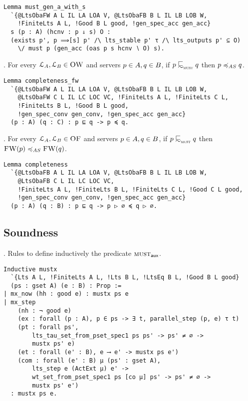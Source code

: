 \begin{mdframed}
\begin{verbatim}
Lemma must_gen_a_with_s
  `{@LtsObaFW A L IL LA LOA V, @LtsObaFB B L IL LB LOB W,
    !FiniteLts A L, !Good B L good, !gen_spec_acc gen_acc}
  s (p : A) (hcnv : p ⇓ s) O :
  (exists p', p ⟹[s] p' /\ lts_stable p' τ /\ lts_outputs p' ⊆ O)
    \/ must p (gen_acc (oas p s hcnv ∖ O) s).
\end{verbatim}
\end{mdframed}

.
For every $\mathcal{L}_A, \mathcal{L}_B \in \textsc{OW}$ and
servers $p \in A, q \in B $,
if ${ \serverA } \testleqS { \serverB }$
then ${ \serverA } \asleq { \serverB }$.

\begin{mdframed}
\begin{verbatim}
Lemma completeness_fw
  `{@LtsObaFW A L IL LA LOA V, @LtsObaFB B L IL LB LOB W,
    @LtsObaFW C L IL LC LOC VC, !FiniteLts A L, !FiniteLts C L,
    !FiniteLts B L, !Good B L good,
    !gen_spec_conv gen_conv, !gen_spec_acc gen_acc}
  (p : A) (q : C) : p ⊑ q -> p ≼ q.
\end{verbatim}
\end{mdframed}

.
For every $\mathcal{L}_A, \mathcal{L}_B \in \textsc{OF}$ and
servers $p \in A, q \in B $,
if $\serverA \testleqS \serverB$ then $\liftFW{ \serverA } \asleq \liftFW{ \serverB }$.

\begin{mdframed}
\begin{verbatim}
Lemma completeness
  `{@LtsObaFB A L IL LA LOA V, @LtsObaFB B L IL LB LOB W,
    @LtsObaFB C L IL LC LOC VC,
    !FiniteLts A L, !FiniteLts B L, !FiniteLts C L, !Good C L good,
    !gen_spec_conv gen_conv, !gen_spec_acc gen_acc}
  (p : A) (q : B) : p ⊑ q -> p ▷ ∅ ≼ q ▷ ∅.
\end{verbatim}
\end{mdframed}

\subsection{Soundness}

. Rules to define inductively the predicate $\operatorname{\textsc{must}}_{\textsf{aux}}$.

\begin{mdframed}
\begin{verbatim}
Inductive mustx
  `{Lts A L, !FiniteLts A L, !Lts B L, !LtsEq B L, !Good B L good}
  (ps : gset A) (e : B) : Prop :=
| mx_now (hh : good e) : mustx ps e
| mx_step
    (nh : ¬ good e)
    (ex : forall (p : A), p ∈ ps -> ∃ t, parallel_step (p, e) τ t)
    (pt : forall ps',
        lts_tau_set_from_pset_spec1 ps ps' -> ps' ≠ ∅ ->
        mustx ps' e)
    (et : forall (e' : B), e ⟶ e' -> mustx ps e')
    (com : forall (e' : B) μ (ps' : gset A),
        lts_step e (ActExt μ) e' ->
        wt_set_from_pset_spec1 ps [co μ] ps' -> ps' ≠ ∅ ->
        mustx ps' e')
  : mustx ps e.
\end{verbatim}
\end{mdframed}

